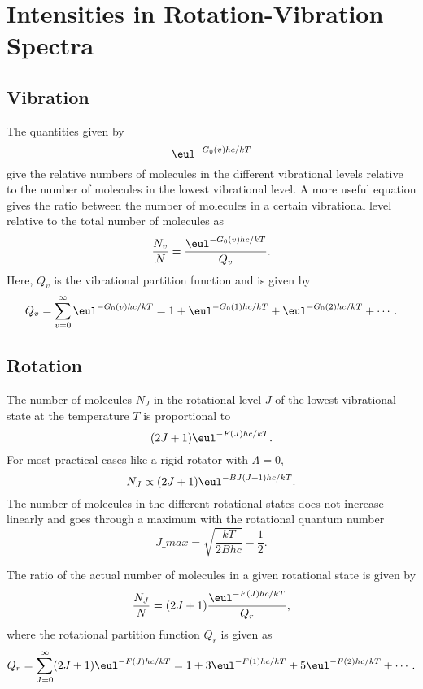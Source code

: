 \chapter{Intensities in Rotation-Vibration Spectra}
\label{c:intensities_in_rotation-vibration_spectra}

\section{Vibration}
\label{s:vibration}

The quantities given by
\begin{equation*}
    \eul^{-G_0(v)hc/kT}
\end{equation*}
give the relative numbers of molecules in the different vibrational levels relative to the number of molecules in the lowest vibrational level. A more useful equation gives the ratio between the number of molecules in a certain vibrational level relative to the total number of molecules as
\begin{equation*}
    \frac{N_v}{N} = \frac{\eul^{-G_0(v)hc/kT}}{Q_v}.
\end{equation*}
Here, $Q_v$ is the vibrational partition function and is given by
\begin{equation*}
    Q_v = \sum_{v=0}^{\infty}\eul^{-G_0(v)hc/kT} = 1 + \eul^{-G_0(1)hc/kT} + \eul^{-G_0(2)hc/kT} + \dotsb.
\end{equation*}

\section{Rotation}
\label{s:rotation}

The number of molecules $N_J$ in the rotational level $J$ of the lowest vibrational state at the temperature $T$ is proportional to
\begin{equation*}
    (2J + 1)\eul^{-F(J)hc/kT}.
\end{equation*}
For most practical cases like a rigid rotator with $\Lambda = 0$,
\begin{equation*}
    N_J \propto (2J + 1)\eul^{-BJ(J + 1)hc/kT}.
\end{equation*}
The number of molecules in the different rotational states does not increase linearly and goes through a maximum with the rotational quantum number
\begin{equation*}
    J\_{max} = \sqrt{\frac{kT}{2Bhc}} - \frac{1}{2}.
\end{equation*}

The ratio of the actual number of molecules in a given rotational state is given by
\begin{equation*}
    \frac{N_J}{N} = (2J + 1)\frac{\eul^{-F(J)hc/kT}}{Q_r},
\end{equation*}
where the rotational partition function $Q_r$ is given as
\begin{equation}
    Q_r = \sum_{J=0}^{\infty}(2J + 1)\eul^{-F(J)hc/kT} = 1 + 3\eul^{-F(1)hc/kT} + 5\eul^{-F(2)hc/kT} + \dotsb.
\end{equation}

